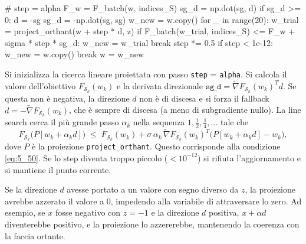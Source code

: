 \documentclass[a4paper,12pt]{article}
\numberwithin{equation}{section}
\numberwithin{figure}{section}
\numberwithin{table}{section}
\begin{document}
\begin{pythoncode}[title= Newton-L1]

#
        step = alpha
        F_w = F_batch(w, indices_S)
        sg_d = np.dot(sg, d)
        if sg_d >= 0:
            d = -sg
            sg_d = -np.dot(sg, sg)
        w_new = w.copy()
        for _ in range(20):
            w_trial = project_orthant(w + step * d, z)
            if F_batch(w_trial, indices_S) <= F_w + sigma * step * sg_d:
                w_new = w_trial
                break
            step *= 0.5
            if step < 1e-12:
                w_new = w.copy()
                break
        w = w_new
\end{pythoncode}
Si inizializza la ricerca lineare proiettata con passo \texttt{step} = \texttt{alpha}. Si calcola il valore dell'obiettivo $F_{\mathcal{S}_k}(w_k)$ e la derivata direzionale $\texttt{sg\_d} = \widetilde{\nabla}F_{\mathcal{S}_k}(w_k)^T d$. Se questa non è negativa, la direzione $d$ non è di discesa e si forza il fallback $d = -\widetilde{\nabla}F_{\mathcal{S}_k}(w_k)$, che è sempre di discesa (a meno di subgradiente nullo). La line search cerca il più grande passo $\alpha_k$ nella sequenza $1,\frac12,\frac14,\dots$ tale che
\[
F_{\mathcal{S}_k}\bigl(P[w_k+\alpha_k d]\bigr) \;\le\; F_{\mathcal{S}_k}(w_k) + \sigma\,\alpha_k\,\widetilde{\nabla}F_{\mathcal{S}_k}(w_k)^T\bigl(P[w_k+\alpha_k d]-w_k\bigr),
\]
dove $P$ è la proiezione \texttt{project\_orthant}. Questo corrisponde alla condizione \eqref{eq:5_50}. Se lo step diventa troppo piccolo ($<10^{-12}$) si rifiuta l'aggiornamento e si mantiene il punto corrente.


Se la direzione $d$ avesse portato a un valore con segno diverso da $z$, la
proiezione avrebbe azzerato il valore a $0$, impedendo alla variabile di
attraversare lo zero. Ad esempio, se $x$ fosse negativo con $z=-1$ e la
direzione $d$ positiva, $x + \alpha d$ diventerebbe positivo, e la proiezione lo
azzererebbe, mantenendo la coerenza con la faccia ortante.
\end{document}
